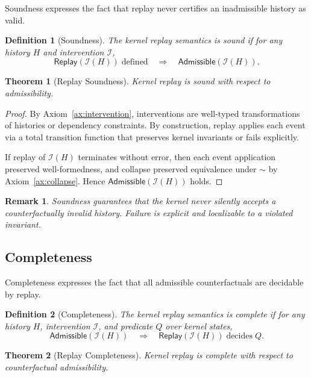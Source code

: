 \documentclass[11pt]{article}
\newtheorem{definition}{Definition}
\newtheorem{remark}{Remark}
\newtheorem{theorem}{Theorem}
\begin{document}
Soundness expresses the fact that replay never certifies an inadmissible history as valid.

\begin{definition}[Soundness]
The kernel replay semantics is \emph{sound} if for any history $H$ and intervention $\mathcal{I}$,
\[
\mathsf{Replay}(\mathcal{I}(H)) \;\text{defined} \quad\Rightarrow\quad \mathsf{Admissible}(\mathcal{I}(H)).
\]
\end{definition}

\begin{theorem}[Replay Soundness]
\label{thm:soundness}
Kernel replay is sound with respect to admissibility.
\end{theorem}

\begin{proof}
By Axiom~\ref{ax:intervention}, interventions are well-typed transformations of histories or dependency constraints. By construction, replay applies each event via a total transition function that preserves kernel invariants or fails explicitly.

If replay of $\mathcal{I}(H)$ terminates without error, then each event application preserved well-formedness, and collapse preserved equivalence under $\sim$ by Axiom~\ref{ax:collapse}. Hence $\mathsf{Admissible}(\mathcal{I}(H))$ holds.
\end{proof}

\begin{remark}
Soundness guarantees that the kernel never silently accepts a counterfactually invalid history. Failure is explicit and localizable to a violated invariant.
\end{remark}

\subsection{Completeness}

Completeness expresses the fact that all admissible counterfactuals are decidable by replay.

\begin{definition}[Completeness]
The kernel replay semantics is \emph{complete} if for any history $H$, intervention $\mathcal{I}$, and predicate $Q$ over kernel states,
\[
\mathsf{Admissible}(\mathcal{I}(H)) \quad\Rightarrow\quad \mathsf{Replay}(\mathcal{I}(H)) \;\text{decides}\; Q.
\]
\end{definition}

\begin{theorem}[Replay Completeness]
\label{thm:completeness}
Kernel replay is complete with respect to counterfactual admissibility.
\end{theorem}
\end{document}
